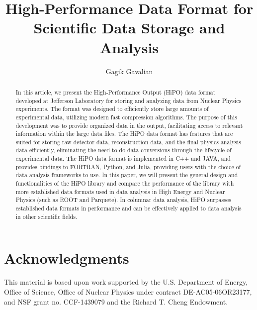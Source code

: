 \documentclass[preprint,12pt]{elsarticle}
\title{High-Performance Data Format for Scientific Data Storage and Analysis}
\author[1]{Gagik Gavalian}
\begin{document}
\begin{abstract}
In this article, we present the High-Performance Output (HiPO) data format developed at Jefferson Laboratory for 
storing and analyzing data from Nuclear Physics experiments. The format was designed to efficiently store large
amounts of experimental data, utilizing modern fast compression algorithms. The purpose of this development was 
to provide organized data in the output, facilitating access to relevant information within the large data files. The HiPO
data format has features that are suited for storing raw detector data, reconstruction data, and the final physics analysis 
data efficiently, eliminating the need to do data conversions through the lifecycle of experimental data. The HiPO data format
is implemented in C++ and JAVA, and provides bindings to FORTRAN, Python, and Julia, providing users with the choice of data 
analysis frameworks to use.
In this paper, we will present the general design and functionalities of the HiPO library and compare the performance of the library with
 more established data formats used in data analysis in High Energy and Nuclear Physics (such as ROOT and Parquete). In columnar data analysis, HiPO surpasses established data formats in performance and can be effectively applied to data analysis in other scientific fields.

\end{abstract}
\maketitle








\section{Acknowledgments}

This material is based upon work supported by the U.S. Department of Energy, Office of Science,
Office of Nuclear Physics under contract DE-AC05-06OR23177, and NSF grant no. CCF-1439079 and
the Richard T. Cheng Endowment. 
 
\end{document}
